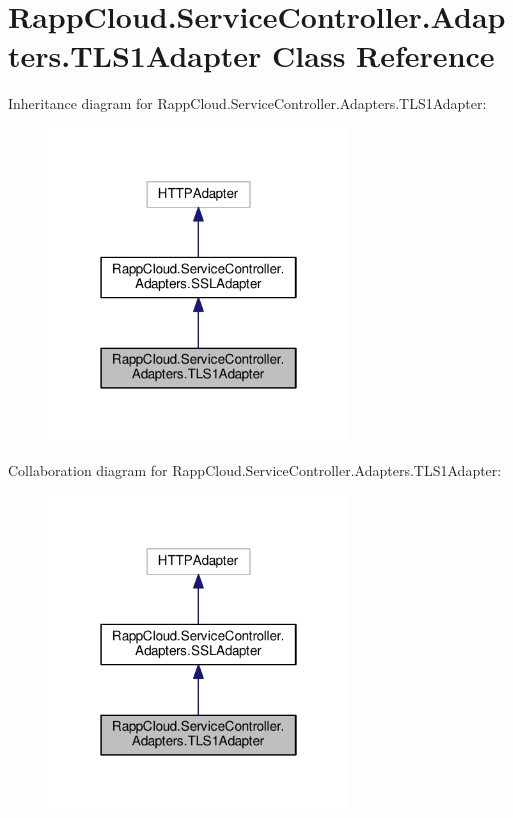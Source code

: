 \hypertarget{classRappCloud_1_1ServiceController_1_1Adapters_1_1TLS1Adapter}{\section{Rapp\-Cloud.\-Service\-Controller.\-Adapters.\-T\-L\-S1\-Adapter Class Reference}
\label{classRappCloud_1_1ServiceController_1_1Adapters_1_1TLS1Adapter}
}


Inheritance diagram for Rapp\-Cloud.\-Service\-Controller.\-Adapters.\-T\-L\-S1\-Adapter\-:
\nopagebreak
\begin{figure}[H]
\begin{center}
\leavevmode
\includegraphics[width=226pt]{classRappCloud_1_1ServiceController_1_1Adapters_1_1TLS1Adapter__inherit__graph}
\end{center}
\end{figure}


Collaboration diagram for Rapp\-Cloud.\-Service\-Controller.\-Adapters.\-T\-L\-S1\-Adapter\-:
\nopagebreak
\begin{figure}[H]
\begin{center}
\leavevmode
\includegraphics[width=226pt]{classRappCloud_1_1ServiceController_1_1Adapters_1_1TLS1Adapter__coll__graph}
\end{center}
\end{figure}

